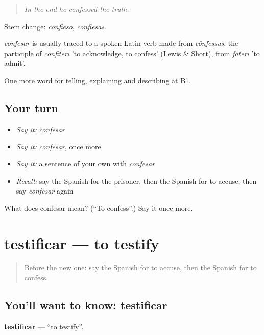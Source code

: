 \begin{quote}
\emph{In the end he confessed the truth.}
\end{quote}

Stem change: \emph{confieso}, \emph{confiesas}.

\begin{cousinweb}
\emph{confesar} is usually traced to a spoken Latin verb made from \emph{cōnfessus}, the participle of \emph{cōnfitērī} 'to acknowledge, to confess' (Lewis \& Short), from \emph{fatērī} 'to admit'.
\end{cousinweb}

\begin{grammarlens}[title={What you've built}]
One more word for telling, explaining and describing at B1.
\end{grammarlens}

\subsection*{Your turn}
\begin{itemize}
\raggedright
  \item \emph{Say it:} \emph{confesar}
  \item \emph{Say it:} \emph{confesar}, once more
  \item \emph{Say it:} a sentence of your own with \emph{confesar}
  \item \emph{Recall:} say the Spanish for the prisoner, then the Spanish for to accuse, then say \emph{confesar} again
\end{itemize}

\begin{tcolorbox}[breakable,colback=teal!4,colframe=teal!35!black,title={Before you move on}]
What does confesar mean? (\textquotedblleft{}To confess\textquotedblright{}.) Say it once more.
\end{tcolorbox}
\section[testificar]{testificar — to testify}

\label{lesson:ES-C523-testificar}



\begin{quote}
Before the new one: say the Spanish for to accuse, then the Spanish for to confess.
\end{quote}

\subsection*{You'll want to know: testificar}
\textbf{testificar} — \textquotedblleft{}to testify\textquotedblright{}.

